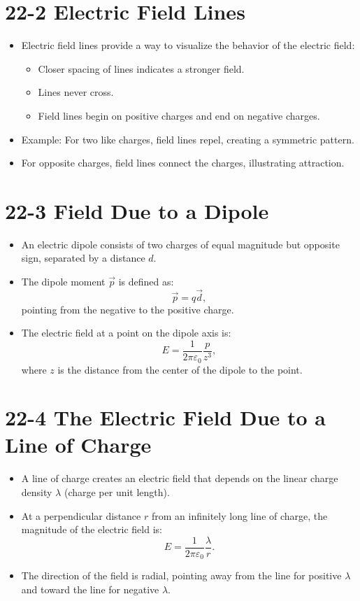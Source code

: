 \documentclass{article}
\begin{document}
\section*{22-2 Electric Field Lines}
\begin{itemize}
    \item Electric field lines provide a way to visualize the behavior of the electric field:
    \begin{itemize}
        \item Closer spacing of lines indicates a stronger field.
        \item Lines never cross.
        \item Field lines begin on positive charges and end on negative charges.
    \end{itemize}
    \item Example: For two like charges, field lines repel, creating a symmetric pattern.
    \item For opposite charges, field lines connect the charges, illustrating attraction.
\end{itemize}

\section*{22-3 Field Due to a Dipole}
\begin{itemize}
    \item An electric dipole consists of two charges of equal magnitude but opposite sign, separated by a distance $d$.
    \item The dipole moment $\vec{p}$ is defined as:
    \[
    \vec{p} = q \vec{d},
    \]
    pointing from the negative to the positive charge.
    \item The electric field at a point on the dipole axis is:
    \[
    E = \frac{1}{2\pi\varepsilon_0} \frac{p}{z^3},
    \]
    where $z$ is the distance from the center of the dipole to the point.
\end{itemize}

\section*{22-4 The Electric Field Due to a Line of Charge}
\begin{itemize}
    \item A line of charge creates an electric field that depends on the linear charge density $\lambda$ (charge per unit length).
    \item At a perpendicular distance $r$ from an infinitely long line of charge, the magnitude of the electric field is:
    \[
    E = \frac{1}{2\pi\varepsilon_0} \frac{\lambda}{r}.
    \]
    \item The direction of the field is radial, pointing away from the line for positive $\lambda$ and toward the line for negative $\lambda$.
\end{itemize}
\end{document}

